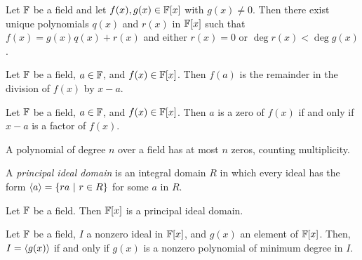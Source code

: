 
\begin{theorem}
	Let $\mathbb{F}$ be a field and let $f(x), g(x) \in \mathbb{F}[x]$ with $g(x) \neq 0$. Then there exist unique polynomials $q(x)$ and $r(x)$ in $\mathbb{F}[x]$ such that $f(x) = g(x)q(x) + r(x)$ and either $r(x) = 0$ or $\deg r(x) < \deg g(x)$.
\end{theorem}

\begin{corollary}
	Let $\mathbb{F}$ be a field, $a \in \mathbb{F}$, and $f(x) \in \mathbb{F}[x]$. Then $f(a)$ is the remainder in the division of $f(x)$ by $x -a$.
\end{corollary}

\begin{corollary}
	Let $\mathbb{F}$ be a field, $a \in \mathbb{F}$, and $f(x) \in \mathbb{F}[x]$. Then $a$ is a zero of $f(x)$ if and only if $x-a$ is a factor of $f(x)$.
\end{corollary}

\begin{corollary}
	A polynomial of degree $n$ over a field has at most $n$ zeros, counting multiplicity.
\end{corollary}

\begin{definition}
	A \textit{principal ideal domain} is an integral domain $R$ in which every ideal has the form $\langle a \rangle=\{ra\ \vert\ r \in R\}$ for some $a$ in $R$.
\end{definition}

\begin{theorem}
	Let $\mathbb{F}$ be a field. Then $\mathbb{F}[x]$ is a principal ideal domain.
\end{theorem}

\begin{theorem}[Criterion for $\mathbf{I = \cyc{g(x)}}$]
	Let $\mathbb{F}$ be a field, $I$ a nonzero ideal in $\mathbb{F}[x]$, and $g(x)$ an element of $\mathbb{F}[x]$. Then, $I=\langle g(x) \rangle$ if and only if $g(x)$ is a nonzero polynomial of minimum degree in $I$.
\end{theorem}
